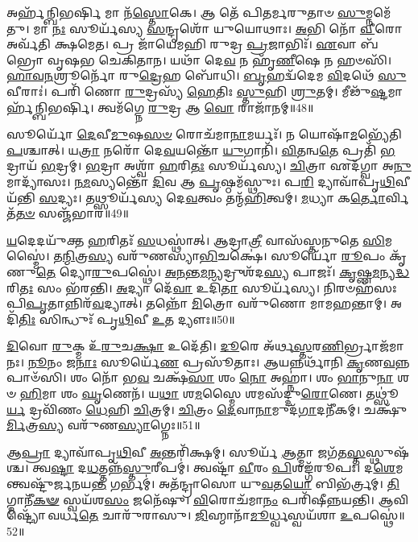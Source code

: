 𑌅𑌰𑍍\mbox{}𑌹᳴𑌨𑍍𑌬𑌿𑌭𑌰𑍍\mbox{}\-\ul{𑌷𑌿} 𑌮𑌾 𑌨᳴\-\ul{𑌸𑍍𑌤𑍋}\-𑌕𑍇।
𑌆 𑌤𑍇᳴ 𑌪𑌿𑌤𑌰𑍍𑌮𑌰𑍁𑌤𑌾𑍞 \ul{𑌸𑍁}\-𑌮𑍍𑌨𑌮𑍇᳴𑌤𑍁।
𑌮𑌾 \ul{𑌨𑌃} 𑌸𑍂𑌰𑍍𑌯᳴𑌸𑍍𑌯 \ul{𑌸}\-𑌨𑍍𑌦𑍃𑌶𑍋᳴ 𑌯𑍁𑌯𑍋𑌥𑌾𑌃।
\-\ul{𑌅}\-𑌭𑌿 𑌨𑍋᳴ \ul{𑌵𑍀}\-𑌰𑍋 𑌅𑌰𑍍𑌵᳴𑌤𑌿 𑌕𑍍𑌷𑌮𑍇𑌤।
𑌪𑍍𑌰 𑌜𑌾᳴𑌯𑍇𑌮𑌹𑌿 𑌰𑍁𑌦𑍍𑌰 \ul{𑌪𑍍𑌰}\-𑌜𑌾𑌭𑌿𑌃᳴।
\-\ul{𑌏}\-𑌵𑌾 𑌬᳴𑌭𑍍𑌰𑍋 𑌵𑍃𑌷𑌭 𑌚𑍇𑌕𑌿𑌤𑌾𑌨।
𑌯𑌥𑌾᳴ 𑌦𑍇\-\ul{𑌵} 𑌨 𑌹𑍃᳴\-\ul{𑌣𑍀}\-𑌷𑍇 𑌨 𑌹𑍞𑌸𑌿᳴।
\-\ul{𑌹𑌾}\-\-\ul{𑌵}\-\-\ul{𑌨}\-𑌶𑍍𑌰𑍂𑌰𑍍𑌨𑍋᳴ 𑌰𑍁\-\ul{𑌦𑍍𑌰𑍇}\-𑌹 𑌬𑍋᳴𑌧𑌿।
\-\ul{𑌬𑍃}\-𑌹𑌦𑍍𑌵᳴𑌦𑍇𑌮 \ul{𑌵𑌿}\-𑌦𑌥𑍇᳴ \ul{𑌸𑍁}\-𑌵𑍀𑌰𑌾𑌃॑।
𑌪𑌰𑌿᳴ 𑌣𑍋 \ul{𑌰𑍁}\-𑌦𑍍𑌰𑌸𑍍𑌯᳴ \ul{𑌹𑍇}\-𑌤𑌿𑌃 \ul{𑌸𑍍𑌤𑍁}\-𑌹𑌿 \ul{𑌶𑍍𑌰𑍁}\-𑌤𑌮𑍍।
𑌮𑍀𑌢𑍁᳴\-\ul{𑌷𑍍𑌟}\-𑌮𑌾𑌰𑍍\mbox{}𑌹᳴𑌨𑍍𑌬𑌿𑌭𑌰𑍍\mbox{}𑌷𑌿।
𑌤𑍍𑌵𑌮᳴𑌗𑍍𑌨𑍇 \ul{𑌰𑍁}\-𑌦𑍍𑌰 𑌆 \ul{𑌵𑍋} 𑌰𑌾𑌜𑌾᳴𑌨𑌮𑍍॥48॥\anuvakamend[𑌵𑌸𑍂᳴𑌨𑌿 𑌤𑌤𑌾𑌨𑌾\-\ul{𑌸𑍍𑌤𑍁} 𑌵𑌿𑌶𑍍𑌵𑌾𑌨𑍍᳴ 𑌵𑌵𑍃𑌤𑍍𑌯𑌾𑌂 𑌵𑌵𑌰𑍍𑌤𑌿 \ul{𑌘𑍃}\-𑌤𑍇\-\ul{𑌨} 𑌵𑌿𑌷𑍂᳴𑌚𑍀𑌃 \ul{𑌶𑍍𑌰𑍁}\-𑌤𑌨𑍍𑌦𑍍𑌵𑍇 𑌚᳴]

𑌸𑍂𑌰𑍍𑌯𑍋᳴ \ul{𑌦𑍇}\-𑌵𑍀\-\ul{𑌮𑍁}\-𑌷\-\ul{𑌸}\-\-\ul{𑍞} 𑌰𑍋𑌚᳴𑌮𑌾\-\ul{𑌨𑌾}\-𑌮𑌰𑍍𑌯𑌃᳴।
𑌨 𑌯𑍋𑌷𑌾᳴\-\ul{𑌮}\-𑌭𑍍𑌯𑍇᳴𑌤𑌿 \ul{𑌪}\-𑌶𑍍𑌚𑌾𑌤𑍍।
𑌯\-\ul{𑌤𑍍𑌰𑌾} 𑌨𑌰𑍋᳴ 𑌦𑍇\-\ul{𑌵}\-𑌯𑌨𑍍𑌤𑍋᳴ \ul{𑌯𑍁}\-𑌗𑌾𑌨𑌿᳴।
\-\ul{𑌵𑌿}\-\-\ul{𑌤}\-𑌨𑍍𑌵\-\ul{𑌤𑍇} 𑌪𑍍𑌰𑌤𑌿᳴ \ul{𑌭}\-𑌦𑍍𑌰𑌾𑌯᳴ \ul{𑌭}\-𑌦𑍍𑌰𑌮𑍍।
\-\ul{𑌭}\-𑌦𑍍𑌰𑌾 𑌅𑌶𑍍𑌵𑌾᳴ \ul{𑌹}\-𑌰𑌿\-\ul{𑌤𑌃} 𑌸𑍂𑌰𑍍𑌯᳴𑌸𑍍𑌯।
\-\ul{𑌚𑌿}\-𑌤𑍍𑌰𑌾 𑌏𑌦᳴𑌗𑍍𑌵𑌾 𑌅\-\ul{𑌨𑍁}\-𑌮𑌾𑌦𑍍𑌯𑌾᳴𑌸𑌃।
\-\ul{𑌨}\-\-\ul{𑌮}\-𑌸𑍍𑌯𑌨𑍍𑌤𑍋᳴ \ul{𑌦𑌿}\-𑌵 𑌆 \ul{𑌪𑍃}\-𑌷𑍍𑌠𑌮᳴𑌸𑍍𑌥𑍁𑌃।
𑌪\-\ul{𑌰𑌿} 𑌦𑍍𑌯𑌾𑌵𑌾᳴𑌪𑍃\-\ul{𑌥𑌿}\-𑌵𑍀 𑌯᳴𑌨𑍍𑌤𑌿 \ul{𑌸}\-𑌦𑍍𑌯𑌃।
𑌤𑌥𑍍𑌸𑍂𑌰𑍍𑌯᳴𑌸𑍍𑌯 𑌦𑍇\-\ul{𑌵}\-𑌤𑍍𑌵𑌂 𑌤𑌨𑍍𑌮᳴\-\ul{𑌹𑌿}\-𑌤𑍍𑌵𑌮𑍍।
\-\ul{𑌮}\-𑌧𑍍𑌯𑌾 𑌕\-\ul{𑌰𑍍𑌤𑍋}\-𑌰𑍍𑌵𑌿𑌤᳴\-\ul{𑌤}\-\-\ul{𑍞} 𑌸𑌞𑍍𑌜᳴𑌭𑌾𑌰॥49॥

\-\ul{𑌯}\-𑌦𑍇𑌦𑌯𑍁᳴𑌕𑍍𑌤 \ul{𑌹}\-𑌰𑌿𑌤𑌃᳴ \ul{𑌸}\-𑌧𑌸𑍍𑌥𑌾॑𑌤𑍍।
𑌆𑌦𑍍𑌰𑌾\-\ul{𑌤𑍍𑌰𑍀} 𑌵𑌾𑌸᳴𑌸𑍍𑌤𑌨𑍁𑌤𑍇 \ul{𑌸𑌿}\-𑌮𑌸𑍍𑌮𑍈॑।
𑌤\-\ul{𑌨𑍍𑌮𑌿}\-𑌤𑍍𑌰\-\ul{𑌸𑍍𑌯} 𑌵𑌰𑍁᳴𑌣𑌸𑍍𑌯𑌾\-\ul{𑌭𑌿}\-𑌚𑌕𑍍𑌷𑍇॑।
𑌸𑍂𑌰𑍍𑌯𑍋᳴ \ul{𑌰𑍂}\-𑌪𑌂 𑌕𑍃᳴𑌣𑍁\-\ul{𑌤𑍇} 𑌦𑍍𑌯𑍋\-\ul{𑌰𑍁}\-𑌪𑌸𑍍𑌥𑍇॑।
\-\ul{𑌅}\-\-\ul{𑌨}\-𑌨𑍍𑌤\-\ul{𑌮}\-𑌨𑍍𑌯𑌦𑍍𑌰𑍁𑌶᳴𑌦\-\ul{𑌸𑍍𑌯} 𑌪𑌾𑌜𑌃᳴।
\-\ul{𑌕𑍃}\-𑌷𑍍𑌣\-\ul{𑌮}\-𑌨𑍍𑌯\-\ul{𑌦𑍍𑌧}\-𑌰𑌿\-\ul{𑌤𑌃} 𑌸𑌂 𑌭᳴𑌰𑌨𑍍𑌤𑌿।
\-\ul{𑌅}\-𑌦𑍍𑌯𑌾 𑌦𑍇᳴\-\ul{𑌵𑌾} 𑌉𑌦𑌿᳴\-\ul{𑌤𑌾} 𑌸𑍂𑌰𑍍𑌯᳴𑌸𑍍𑌯।
𑌨𑌿𑌰𑍞𑌹᳴𑌸𑌃 𑌪𑌿\-\ul{𑌪𑍃}\-𑌤𑌾𑌨𑍍𑌨𑌿𑌰᳴\-\ul{𑌵}\-𑌦𑍍𑌯𑌾𑌤𑍍।
𑌤𑌨𑍍𑌨𑍋᳴ \ul{𑌮𑌿}\-𑌤𑍍𑌰𑍋 𑌵𑌰𑍁᳴𑌣𑍋 𑌮𑌾𑌮𑌹𑌨𑍍𑌤𑌾𑌮𑍍।
𑌅𑌦𑌿᳴\-\ul{𑌤𑌿𑌃} 𑌸𑌿𑌨𑍍𑌧𑍁𑌃᳴ 𑌪𑍃\-\ul{𑌥𑌿}\-𑌵𑍀 \ul{𑌉}\-𑌤 𑌦𑍍𑌯𑍗𑌃॥50॥

\-\ul{𑌦𑌿}\-𑌵𑍋 \ul{𑌰𑍁}\-𑌕𑍍𑌮 𑌉᳴\-\ul{𑌰𑍁}\-𑌚\-\ul{𑌕𑍍𑌷𑌾} 𑌉𑌦𑍇᳴𑌤𑌿।
\-\ul{𑌦𑍂}\-𑌰𑍇 𑌅᳴𑌰𑍍𑌥\-\ul{𑌸𑍍𑌤}\-𑌰\-\ul{𑌣𑌿}\-𑌰𑍍𑌭𑍍𑌰𑌾𑌜᳴𑌮𑌾𑌨𑌃।
\-\ul{𑌨𑍂}\-𑌨𑌂 𑌜\-\ul{𑌨𑌾𑌃} 𑌸𑍂𑌰𑍍𑌯𑍇᳴\-\ul{𑌣} 𑌪𑍍𑌰𑌸𑍂᳴𑌤𑌾𑌃।
𑌆𑌯𑌨𑍍𑌨𑌰𑍍𑌥𑌾᳴𑌨𑌿 \ul{𑌕𑍃}\-𑌣\-\ul{𑌵}\-𑌨𑍍𑌨𑌪𑌾𑍞᳴𑌸𑌿।
𑌶𑌂 𑌨𑍋᳴ 𑌭\-\ul{𑌵} 𑌚𑌕𑍍𑌷᳴\-\ul{𑌸𑌾} 𑌶𑌂 \ul{𑌨𑍋} 𑌅𑌹𑍍𑌨𑌾॑।
𑌶𑌂 \ul{𑌭𑌾}\-𑌨𑍁\-\ul{𑌨𑌾} 𑌶𑍞 \ul{𑌹𑌿}\-𑌮𑌾 𑌶𑌂 \ul{𑌘𑍃}\-𑌣𑍇𑌨᳴।
𑌯\-\ul{𑌥𑌾} 𑌶\-\ul{𑌮}\-𑌸𑍍𑌮𑍈 𑌶𑌮𑌸᳴𑌦𑍍𑌦𑍁\-\ul{𑌰𑍋}\-𑌣𑍇।
𑌤𑌥𑍍𑌸𑍂॑\-\ul{𑌰𑍍𑌯} 𑌦𑍍𑌰𑌵𑌿᳴𑌣𑌂 \ul{𑌧𑍇}\-𑌹𑌿 \ul{𑌚𑌿}\-𑌤𑍍𑌰𑌮𑍍।
\-\ul{𑌚𑌿}\-𑌤𑍍𑌰𑌂 \ul{𑌦𑍇}\-𑌵𑌾\-\ul{𑌨𑌾}\-𑌮𑍁𑌦᳴\-\ul{𑌗𑌾}\-𑌦𑌨𑍀᳴𑌕𑌮𑍍।
𑌚𑌕𑍍𑌷𑍁᳴\-\ul{𑌰𑍍𑌮𑌿}\-𑌤𑍍𑌰\-\ul{𑌸𑍍𑌯} 𑌵𑌰𑍁᳴𑌣\-\ul{𑌸𑍍𑌯𑌾}\-𑌗𑍍𑌨𑍇𑌃॥51॥

𑌆\-\ul{𑌪𑍍𑌰𑌾} 𑌦𑍍𑌯𑌾𑌵𑌾᳴𑌪𑍃\-\ul{𑌥𑌿}\-𑌵𑍀 \ul{𑌅}\-𑌨𑍍𑌤𑌰𑌿᳴𑌕𑍍𑌷𑌮𑍍।
𑌸𑍂𑌰𑍍𑌯᳴ \ul{𑌆}\-𑌤𑍍𑌮𑌾 𑌜𑌗᳴𑌤\-\ul{𑌸𑍍𑌤}\-𑌸𑍍𑌥𑍁𑌷᳴𑌶𑍍𑌚।
𑌤𑍍𑌵\-\ul{𑌷𑍍𑌟𑌾} 𑌦\-\ul{𑌧}\-𑌤𑍍𑌤𑌨𑍍𑌨᳴\-\ul{𑌸𑍍𑌤𑍁}\-𑌰𑍀𑌪𑌮𑍍॑।
𑌤𑍍𑌵𑌷𑍍𑌟𑌾᳴ \ul{𑌵𑍀}\-𑌰𑌂 \ul{𑌪𑌿}\-𑌶𑌙𑍍𑌗᳴𑌰𑍂𑌪𑌃।
𑌦\-\ul{𑌶𑍇}\-𑌮𑌨𑍍𑌤𑍍𑌵𑌷𑍍𑌟𑍁᳴𑌰𑍍𑌜𑌨𑌯\-\ul{𑌨𑍍𑌤} 𑌗𑌰𑍍𑌭𑌮𑍍॑।
𑌅𑌤᳴𑌨𑍍𑌦𑍍𑌰𑌾𑌸𑍋 𑌯𑍁\-\ul{𑌵}\-𑌤\-\ul{𑌯𑍋} 𑌬𑌿𑌭᳴𑌰𑍍𑌤𑍍𑌰𑌮𑍍।
\-\ul{𑌤𑌿}\-𑌗𑍍𑌮𑌾𑌨𑍀᳴\-\ul{𑌕}\-\-\ul{𑍟} 𑌸𑍍𑌵𑌯᳴𑌶\-\ul{𑌸𑌂} 𑌜𑌨𑍇᳴𑌷𑍁।
\-\ul{𑌵𑌿}\-𑌰𑍋𑌚᳴𑌮𑌾\-\ul{𑌨𑌂} 𑌪𑌰𑌿᳴𑌷𑍀𑌨𑍍𑌨𑌯𑌨𑍍𑌤𑌿।
𑌆𑌵𑌿𑌷𑍍𑌟𑍍𑌯𑍋᳴ 𑌵𑌰𑍍𑌧\-\ul{𑌤𑍇} 𑌚𑌾𑌰𑍁᳴𑌰𑌾𑌸𑍁।
\-\ul{𑌜𑌿}\-𑌹𑍍𑌮𑌾𑌨𑌾᳴\-\ul{𑌮𑍂}\-𑌰𑍍𑌧𑍍𑌵𑌸𑍍𑌵𑌯᳴𑌶𑌾 \ul{𑌉}\-𑌪𑌸𑍍𑌥𑍇॑॥52॥

